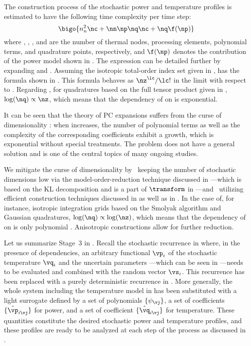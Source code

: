 The construction process of the stochastic power and temperature profiles is
estimated to have the following time complexity per time step:
\[
  \bigo{n_n^2 \nc + \nn \np \nq \nc + \nq \f(\np)}
\]
where \nn, \np, \nc, and \nq are the number of thermal nodes, processing
elements, polynomial terms, and quadrature points, respectively, and $\f(\np)$
denotes the contribution of the power model shown in .
The expression can be detailed further by expanding \nc and \nq. Assuming the
isotropic total-order index set given in , \nc
has the formula shown in . This formula
behaves as $\nz^\lc / \lc!$ in the limit with respect to \nz. Regarding \nq, for
quadratures based on the full tensor product given in ,
$\log(\nq) \propto \nz$, which means that the dependency of \nq on \nz is
exponential.

It can be seen that the theory of \ac{PC} expansions suffers from the curse of
dimensionality \cite{eldred2008, xiu2010}: when \nz increases, the number of
polynomial terms as well as the complexity of the corresponding coefficients
exhibit a growth, which is exponential without special treatments. The problem
does not have a general solution and is one of the central topics of many
ongoing studies.

We mitigate the curse of dimensionality by \one~keeping the number of stochastic
dimensions low via the model-order-reduction technique discussed in
---which is based on the \ac{KL} decomposition
and is a part of $\transform$ in ---and
\two~utilizing efficient construction techniques discussed in
 as well as in . In the case
of, for instance, isotropic integration grids based on the Smolyak algorithm and
Gaussian quadratures, $\log(\nq) \propto \log(\nz)$, which means that the
dependency of \nq on \nz is only polynomial \cite{heiss2008}. Anisotropic
constructions allow for further reduction.

Let us summarize Stage~3 in . Recall the stochastic
recurrence in  where, in the presence of
dependencies, an arbitrary functional $\vp_i$ of the stochastic temperature
$\vq_i$ and the uncertain parameters \vu---which can be seen in
---needs to be evaluated and combined with the random
vector $\vs_i$. This recurrence has been replaced with a purely deterministic
recurrence in . More generally, the whole system
including the temperature model in  has been
substituted with a light surrogate defined by a set of polynomials $\{
\psi_{\vj} \}$, a set of coefficients $\{ \hat{\vp}_{i \vj} \}$ for power, and a
set of coefficient $\{ \hat{\vq}_{i \vj} \}$ for temperature. These quantities
constitute the desired stochastic power and temperature profiles, and these
profiles are ready to be analyzed at each step of the process as discussed in
.

